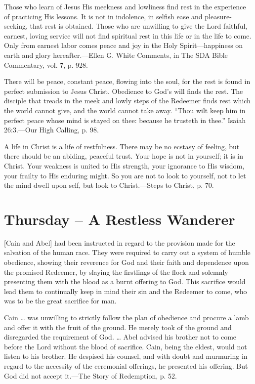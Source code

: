 \documentclass[a4paper, 10pt, twoside, headings=small]{scrartcl}
\begin{document}
\begin{multicols}{2}
Those who learn of Jesus His meekness and lowliness find rest in the experience of practicing His lessons. It is not in indolence, in selfish ease and pleasure-seeking, that rest is obtained. Those who are unwilling to give the Lord faithful, earnest, loving service will not find spiritual rest in this life or in the life to come. Only from earnest labor comes peace and joy in the Holy Spirit—happiness on earth and glory hereafter.—Ellen G. White Comments, in The SDA Bible Commentary, vol. 7, p. 928.

There will be peace, constant peace, flowing into the soul, for the rest is found in perfect submission to Jesus Christ. Obedience to God’s will finds the rest. The disciple that treads in the meek and lowly steps of the Redeemer finds rest which the world cannot give, and the world cannot take away. “Thou wilt keep him in perfect peace whose mind is stayed on thee: because he trusteth in thee.” Isaiah 26:3.—Our High Calling, p. 98.

A life in Christ is a life of restfulness. There may be no ecstasy of feeling, but there should be an abiding, peaceful trust. Your hope is not in yourself; it is in Christ. Your weakness is united to His strength, your ignorance to His wisdom, your frailty to His enduring might. So you are not to look to yourself, not to let the mind dwell upon self, but look to Christ.—Steps to Christ, p. 70.

\section*{Thursday – A Restless Wanderer}

[Cain and Abel] had been instructed in regard to the provision made for the salvation of the human race. They were required to carry out a system of humble obedience, showing their reverence for God and their faith and dependence upon the promised Redeemer, by slaying the firstlings of the flock and solemnly presenting them with the blood as a burnt offering to God. This sacrifice would lead them to continually keep in mind their sin and the Redeemer to come, who was to be the great sacrifice for man.

Cain … was unwilling to strictly follow the plan of obedience and procure a lamb and offer it with the fruit of the ground. He merely took of the ground and disregarded the requirement of God. … Abel advised his brother not to come before the Lord without the blood of sacrifice. Cain, being the eldest, would not listen to his brother. He despised his counsel, and with doubt and murmuring in regard to the necessity of the ceremonial offerings, he presented his offering. But God did not accept it.—The Story of Redemption, p. 52.


\end{multicols}
\end{document}
